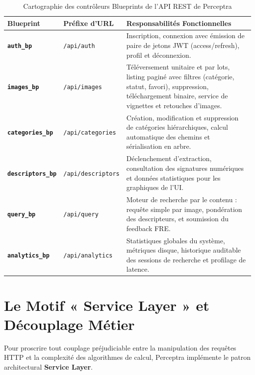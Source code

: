 \begin{table}[H]
\centering
{}
\begin{tabularx}{\textwidth}{>{\bfseries}p{3.2cm}p{3.8cm}X}
\toprule
\rowcolor{TableHeader}
\color{white}Blueprint & \color{white}Préfixe d'URL & \color{white}Responsabilités Fonctionnelles \\
\midrule
\texttt{auth\_bp} & \texttt{/api/auth} & Inscription, connexion avec émission de paire de jetons JWT (access/refresh), profil et déconnexion. \\
\texttt{images\_bp} & \texttt{/api/images} & Téléversement unitaire et par lots, listing paginé avec filtres (catégorie, statut, favori), suppression, téléchargement binaire, service de vignettes et retouches d'images. \\
\texttt{categories\_bp} & \texttt{/api/categories} & Création, modification et suppression de catégories hiérarchiques, calcul automatique des chemins et sérialisation en arbre. \\
\texttt{descriptors\_bp} & \texttt{/api/descriptors} & Déclenchement d'extraction, consultation des signatures numériques et données statistiques pour les graphiques de l'UI. \\
\texttt{query\_bp} & \texttt{/api/query} & Moteur de recherche par le contenu : requête simple par image, pondération des descripteurs, et soumission du feedback FRE. \\
\texttt{analytics\_bp} & \texttt{/api/analytics} & Statistiques globales du système, métriques disque, historique auditable des sessions de recherche et profilage de latence. \\
\bottomrule
\end{tabularx}
\caption{Cartographie des contrôleurs Blueprints de l'API REST de Perceptra}
\label{tab:blueprints}
\end{table}

\section{Le Motif « Service Layer » et Découplage Métier}

Pour proscrire tout couplage préjudiciable entre la manipulation des requêtes HTTP et la complexité des algorithmes de calcul, Perceptra implémente le patron architectural \textbf{Service Layer}.

